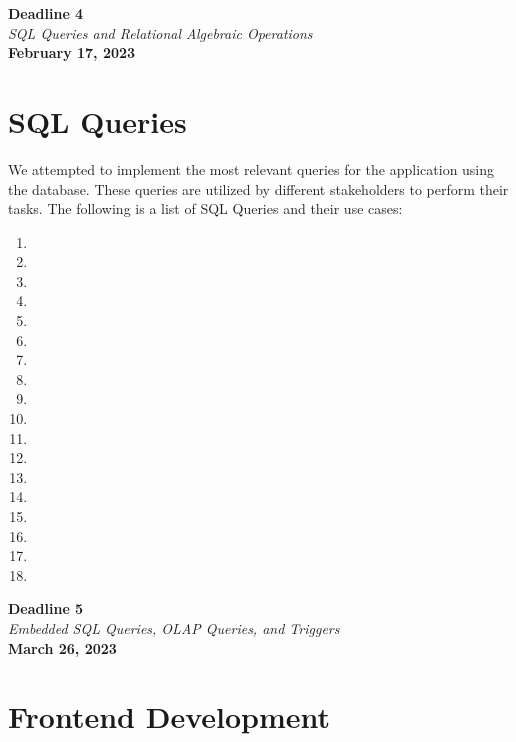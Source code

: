 \documentclass[12pt]{report}
\newcommand{\deadline}[3]{
    \hspace{0pt}
    \vfill
    \begin{center}
        \Huge \textbf{Deadline #1} \\
        \vspace*{5pt}
        \Large \textit{#2} \\
        \vspace*{25pt}
        \large \textbf{#3}
    \end{center}
    \vfill
    \pagebreak
}
\begin{document}
    \pagebreak

    \deadline{4}{SQL Queries and Relational Algebraic Operations}{February 17, 2023}

    \section*{\Huge SQL Queries}
    We attempted to implement the most relevant queries for the application using the database.
    These queries are utilized by different stakeholders to perform their tasks.
    The following is a list of SQL Queries and their use cases:

    \begin{enumerate}
    \item 
    \item 
    \item 
    \item 
    \item 
    \item 
    \item 
    \item 
    \item 
    \item 
    \item 
    \item 
    \item 
    \item 
    \item 
    \item 
    \item 
    \item 
    \end{enumerate}

    \pagebreak

    \deadline{5}{Embedded SQL Queries, OLAP Queries, and Triggers}{March 26, 2023}

    \section*{\Huge Frontend Development}
    \vspace*{10pt}
\end{document}
